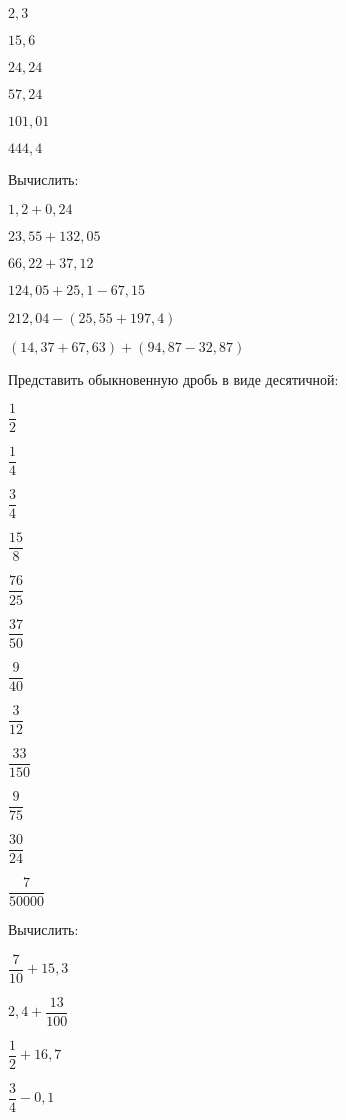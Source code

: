 \begin{class}[number=1]
\begin{listofex}
		\begin{enumcols}[itemcolumns=6]
			\item \( 2,3 \)
			\item \( 15,6 \)
			\item \( 24,24 \)
			\item \( 57,24 \)
			\item \( 101,01 \)
			\item \( 444,4 \)
		\end{enumcols}
		\item Вычислить:
		\begin{enumcols}[itemcolumns=2]
			\item \( 1,2+0,24 \)
			\item \( 23,55+132,05 \)
			\item \( 66,22+37,12 \)
			\item \( 124,05+25,1-67,15 \)
			\item \( 212,04-(25,55+197,4) \)
			\item \( (14,37+67,63)+(94,87-32,87) \)
		\end{enumcols}
		\item Представить обыкновенную дробь в виде десятичной:
		\begin{enumcols}[itemcolumns=6]
			\item \( \dfrac{1}{2} \)
			\item \( \dfrac{1}{4} \)
			\item \( \dfrac{3}{4} \)
			\item \( \dfrac{15}{8} \)
			\item \( \dfrac{76}{25} \)
			\item \( \dfrac{37}{50} \)
			\item \( \dfrac{9}{40} \)
			\item \( \dfrac{3}{12} \)
			\item \( \dfrac{33}{150} \)
			\item \( \dfrac{9}{75} \)
			\item \( \dfrac{30}{24} \)
			\item \( \dfrac{7}{50000} \)
		\end{enumcols}
		\item Вычислить:
		\begin{enumcols}[itemcolumns=6]
			\item \( \dfrac{7}{10}+15,3 \)
			\item \( 2,4+\dfrac{13}{100} \)
			\item \( \dfrac{1}{2}+16,7 \)
			\item \( \dfrac{3}{4}-0,1 \)

\end{enumcols}
\end{listofex}
\end{class}
